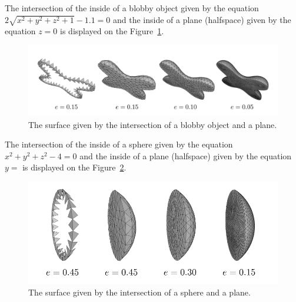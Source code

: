 The intersection of the inside of a blobby object given by the equation
\newline
$2\sqrt{x^2+y^2+z^2+1}-1.1=0$ 
and the inside of a plane (halfspace) given by the 
equation $z=0$ is displayed on the Figure~\ref{img:74}.
\begin{figure}[h!]
    \centerline{\includegraphics[scale=0.5]{images/img74}}
    \caption[The surface given by the intersection of a blobby object and a plane]
    {The surface given by the intersection of a blobby object and a plane.}
    \label{img:74}
\end{figure}

The intersection of the inside of a sphere given by the equation
$x^2+y^2+z^2-4=0$ and the inside of a plane (halfspace) given by the 
equation $y=$ is displayed on the Figure~\ref{img:72}.
\begin{figure}[h!]
    \centerline{\includegraphics[scale=0.5]{images/img72}}
    \caption[The surface given by the intersection of a sphere and a plane]
    {The surface given by the intersection of a sphere and a plane.}
    \label{img:72}
\end{figure}

